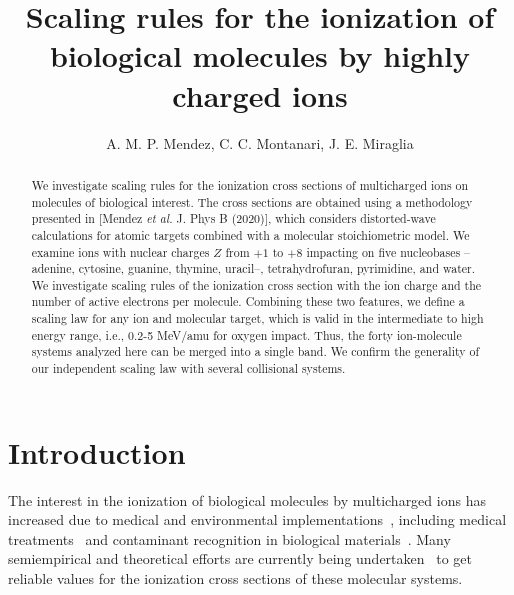 \documentclass[10pt,showpacs,showkeys,twocolumn]{revtex4-1}
\begin{document}
\title[Scaling rules for the ionization of biological
molecules]{Scaling rules for the ionization of biological
molecules by highly charged ions}
\author{A. M. P. Mendez, C. C. Montanari, J. E. Miraglia}

\begin{abstract}
We investigate scaling rules for the ionization cross sections of
multicharged ions on molecules of biological interest. The cross 
sections are obtained using a methodology presented in [Mendez 
\textit{et al.} J. Phys B (2020)], which considers distorted-wave 
calculations for atomic targets combined with a molecular 
stoichiometric model. We examine ions with nuclear charges $Z$ from 
$+1$ to $+8$ impacting on five nucleobases --adenine, cytosine, 
guanine, thymine, uracil--, tetrahydrofuran, pyrimidine, and water. 
We investigate scaling rules of the ionization cross section with 
the ion charge and the number of active electrons per molecule. 
Combining these two features, we define a scaling law for any ion and 
molecular target, which is valid in the intermediate to high energy 
range, i.e., 0.2-5 MeV/amu for oxygen impact. Thus, the forty 
ion-molecule systems analyzed here can be merged into a single band. 
We confirm the generality of our independent scaling law with several
collisional systems. 
\end{abstract}


\maketitle

\section{Introduction}

The interest in the ionization of biological molecules by 
multicharged ions has increased due to medical and environmental
implementations~\cite{PhysMed}, including medical 
treatments~\cite{Mohamad2017,Solov2009,Denifl2011} and contaminant 
recognition in biological materials~\cite{water,ferrazdias}. 
Many semiempirical \citep{vera_prl2013} and theoretical efforts are 
currently being undertaken~\cite{MendezJPB20,Quinto20,ludde2019,
ludde2018,ludde2016,Champion2012} to get reliable values for the 
ionization cross sections of these molecular systems. 
\end{document}
